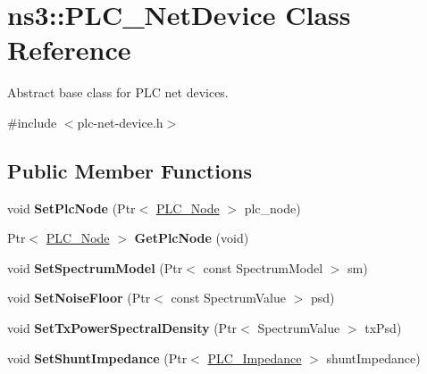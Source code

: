 \hypertarget{classns3_1_1PLC__NetDevice}{\section{ns3\-:\-:\-P\-L\-C\-\_\-\-Net\-Device \-Class \-Reference}
\label{classns3_1_1PLC__NetDevice}
}


\-Abstract base class for \-P\-L\-C net devices.  




{\ttfamily \#include $<$plc-\/net-\/device.\-h$>$}

\subsection*{\-Public \-Member \-Functions}
\begin{DoxyCompactItemize}
\item 
\hypertarget{classns3_1_1PLC__NetDevice_a66eb7f016c732c9d3095fd1a3a54caf3}{void {\bfseries \-Set\-Plc\-Node} (\-Ptr$<$ \hyperlink{classns3_1_1PLC__Node}{\-P\-L\-C\-\_\-\-Node} $>$ plc\-\_\-node)}\label{classns3_1_1PLC__NetDevice_a66eb7f016c732c9d3095fd1a3a54caf3}

\item 
\hypertarget{classns3_1_1PLC__NetDevice_acd6d377e310bfcf09aaec9b86b566054}{\-Ptr$<$ \hyperlink{classns3_1_1PLC__Node}{\-P\-L\-C\-\_\-\-Node} $>$ {\bfseries \-Get\-Plc\-Node} (void)}\label{classns3_1_1PLC__NetDevice_acd6d377e310bfcf09aaec9b86b566054}

\item 
\hypertarget{classns3_1_1PLC__NetDevice_a388b371890eb4741a037cb87204d9c0e}{void {\bfseries \-Set\-Spectrum\-Model} (\-Ptr$<$ const \-Spectrum\-Model $>$ sm)}\label{classns3_1_1PLC__NetDevice_a388b371890eb4741a037cb87204d9c0e}

\item 
\hypertarget{classns3_1_1PLC__NetDevice_aa3e52ca541e3699be3090af2ca771122}{void {\bfseries \-Set\-Noise\-Floor} (\-Ptr$<$ const \-Spectrum\-Value $>$ psd)}\label{classns3_1_1PLC__NetDevice_aa3e52ca541e3699be3090af2ca771122}

\item 
\hypertarget{classns3_1_1PLC__NetDevice_a92a704a043bac4c3997b0aa03f04d651}{void {\bfseries \-Set\-Tx\-Power\-Spectral\-Density} (\-Ptr$<$ \-Spectrum\-Value $>$ tx\-Psd)}\label{classns3_1_1PLC__NetDevice_a92a704a043bac4c3997b0aa03f04d651}

\item 
\hypertarget{classns3_1_1PLC__NetDevice_a72c3b1a43cc784ff6ac04fbba3b230a0}{void {\bfseries \-Set\-Shunt\-Impedance} (\-Ptr$<$ \hyperlink{classns3_1_1PLC__ValueBase}{\-P\-L\-C\-\_\-\-Impedance} $>$ shunt\-Impedance)}\label{classns3_1_1PLC__NetDevice_a72c3b1a43cc784ff6ac04fbba3b230a0}


\end{DoxyCompactItemize}
